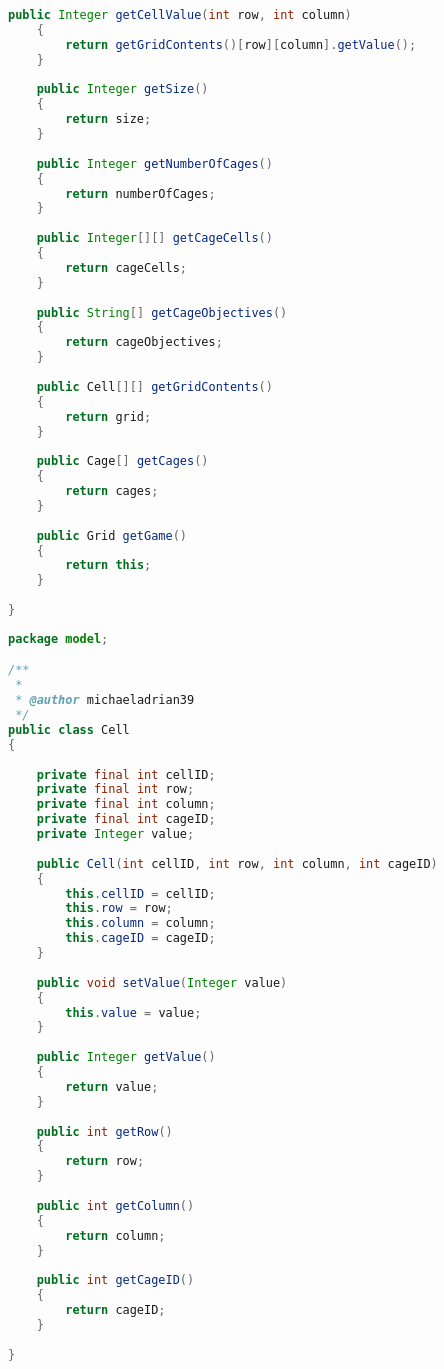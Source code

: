 \begin{lstlisting}[language=Java,basicstyle=\tiny,caption=Grid.java]
    public Integer getCellValue(int row, int column)
    {
        return getGridContents()[row][column].getValue();
    }
        
    public Integer getSize()
    {
        return size;
    }
    
    public Integer getNumberOfCages()
    {
        return numberOfCages;
    }
    
    public Integer[][] getCageCells()
    {
        return cageCells;
    } 
    
    public String[] getCageObjectives()
    {
        return cageObjectives;
    }
    
    public Cell[][] getGridContents()
    {
        return grid;
    }
    
    public Cage[] getCages()
    {
        return cages;
    }
    
    public Grid getGame()
    {
        return this;
    }
    
}
\end{lstlisting}

\begin{lstlisting}[language=Java,basicstyle=\tiny,caption=Cell.java]
package model;

/**
 *
 * @author michaeladrian39
 */
public class Cell
{
    
    private final int cellID;
    private final int row;
    private final int column;
    private final int cageID;
    private Integer value;
    
    public Cell(int cellID, int row, int column, int cageID)
    {
        this.cellID = cellID;
        this.row = row;
        this.column = column;
        this.cageID = cageID;
    }
    
    public void setValue(Integer value)
    {
        this.value = value;
    }
    
    public Integer getValue()
    {
        return value;
    }
    
    public int getRow()
    {
        return row;
    }
     
    public int getColumn()
    {
        return column;
    }
    
    public int getCageID()
    {
        return cageID;
    }
    
}
\end{lstlisting}

